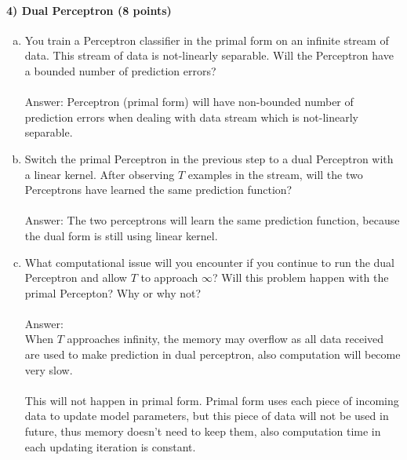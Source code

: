 \documentclass[11pt]{article}
\begin{document}
\paragraph{4) Dual Perceptron (8 points)} 
\begin{enumerate}[(c)]
\item You train a Perceptron classifier in the primal form on an infinite stream of data. This stream of data is not-linearly separable. Will the Perceptron have a bounded number of prediction errors?\\\\
Answer: Perceptron (primal form) will have non-bounded number of prediction errors when dealing with data stream which is not-linearly separable. \\
\item Switch the primal Perceptron in the previous step to a dual Perceptron with a linear kernel. After observing $T$ examples in the stream, will the two Perceptrons have learned the same prediction function?\\\\
Answer: The two perceptrons will learn the same prediction function, because the dual form is still using linear kernel.\\
\item What computational issue will you encounter if you continue to run the dual Perceptron and allow $T$ to approach $\infty$? Will this problem happen with the primal Percepton? Why or why not?\\\\
Answer: \\
When $T$ approaches infinity, the memory may overflow as all data received are used to make prediction in dual perceptron, also computation will become very slow.\\\\
This will not happen in primal form. Primal form uses each piece of incoming data to update model parameters, but this piece of data will not be used in future, thus memory doesn't need to keep them, also computation time in each updating iteration is constant. 
\end{enumerate}
\end{document}

